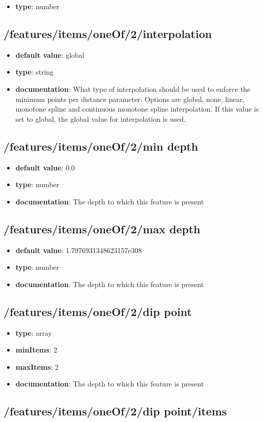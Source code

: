 \begin{itemize}\item {\bf type}: number
\end{itemize}\subsection{/features/items/oneOf/2/interpolation}
\begin{itemize}\item {\bf default value}: global
\item {\bf type}: string
\item {\bf documentation}: What type of interpolation should be used to enforce the minimum points per distance parameter. Options are global, none, linear, monotone spline and continuous monotone spline interpolation. If this value is set to global, the global value for interpolation is used.
\end{itemize}\subsection{/features/items/oneOf/2/min depth}
\begin{itemize}\item {\bf default value}: 0.0
\item {\bf type}: number
\item {\bf documentation}: The depth to which this feature is present
\end{itemize}\subsection{/features/items/oneOf/2/max depth}
\begin{itemize}\item {\bf default value}: 1.7976931348623157e308
\item {\bf type}: number
\item {\bf documentation}: The depth to which this feature is present
\end{itemize}\subsection{/features/items/oneOf/2/dip point}
\begin{itemize}\item {\bf type}: array
\item {\bf minItems}: 2
\item {\bf maxItems}: 2
\item {\bf documentation}: The depth to which this feature is present
\end{itemize}\subsection{/features/items/oneOf/2/dip point/items}
